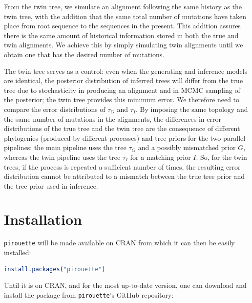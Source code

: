 From the twin tree, we simulate an alignment following the same
history as the twin tree, with the addition that 
the same total number of mutations have
taken place from root sequence to the sequences in the present.
This addition assures there is the same amount of historical information
stored in both the true and twin alignments.
We achieve this by simply simulating twin alignments until we
obtain one that has the desired number of mutations.

The twin tree serves as a control: even when the generating and inference models are identical, the posterior distribution of inferred trees will differ from the true tree due to stochasticity in producing an alignment and in MCMC sampling of the posterior; the twin tree provides this minimum error. We therefore need to compare the error distributions of $\tau_{\mathit{G}}$ and 
$\tau_{\mathit{I}}$. 
By imposing the same topology and the same number of mutations in the alignments, the differences in error distributions of the true tree and the twin tree are the consequence of different phylogenies (produced by different processes) and tree priors for the two parallel 
pipelines: the main pipeline uses the tree $\tau_{\mathit{G}}$ and a
possibly mismatched prior $\mathit{G}$, whereas the twin pipeline
uses the tree $\tau_{\mathit{I}}$ for a matching prior $\mathit{I}$.
So, for the twin trees, if the process is repeated a sufficient number of times, the resulting error distribution cannot be 
attributed to a mismatch between the true tree prior and the tree prior used in
inference.

\section{Installation}

\verb;pirouette; will be made available on CRAN from which it can then be easily installed:
\begin{lstlisting}[language=R, floatplacement=ht, frame=single]
install.packages("pirouette")
\end{lstlisting}

Until it is on CRAN, and for the most up-to-date version, 
one can download and install the package from \verb;pirouette;'s GitHub 
repository:

